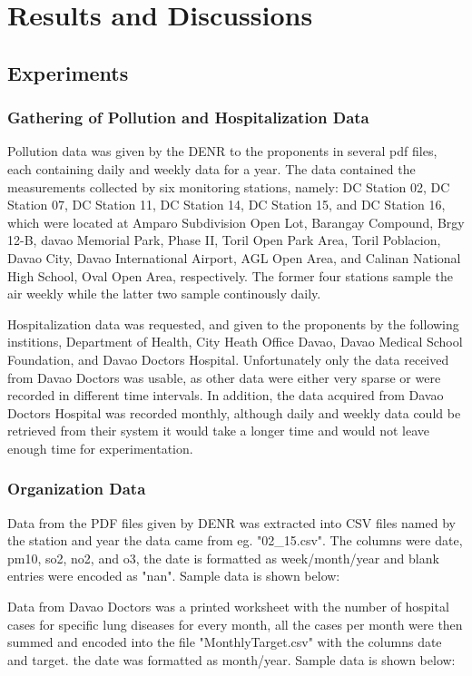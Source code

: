 \documentclass[10pt,11pt,12pt,oneside]{book}
\begin{document}
\chapter{Results and Discussions}    
\section{Experiments}
\subsection{Gathering of Pollution and Hospitalization Data}
Pollution data was given by the DENR to the proponents in several pdf files, each containing daily and weekly data for a year. The data contained the measurements collected by six monitoring stations, namely: DC Station 02, DC Station 07, DC Station 11, DC Station 14, DC Station 15, and DC Station 16, which were located at Amparo Subdivision Open Lot, Barangay Compound, Brgy 12-B, davao Memorial Park, Phase II, Toril Open Park Area, Toril Poblacion, Davao City, Davao International Airport, AGL Open
Area, and Calinan National High School, Oval Open Area, respectively. The former four stations sample the air weekly while the latter two sample continously daily.

Hospitalization data was requested, and given to the proponents by the following institions, Department of Health, City Heath Office Davao, Davao Medical School Foundation, and Davao Doctors Hospital. Unfortunately only the data received from Davao Doctors was usable, as other data were either very sparse or were recorded in different time intervals. In addition, the data acquired from Davao Doctors Hospital was recorded monthly, although daily and weekly data could be retrieved from
their system it would take a longer time and would not leave enough time for experimentation.
\subsection{Organization Data}
Data from the PDF files given by DENR was extracted into CSV files named by the station and year the data came from eg. "02\_15.csv". The columns were date, pm10, so2, no2, and o3, the date is formatted as week/month/year and blank entries were encoded as "nan". Sample data is shown below:

Data from Davao Doctors was a printed worksheet with the number of hospital cases for specific lung diseases for every month, all the cases per month were then summed and encoded into the file "MonthlyTarget.csv" with the columns date and target. the date was formatted as month/year. Sample data is shown below:
\end{document}
